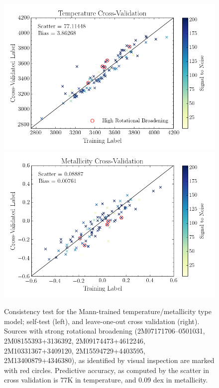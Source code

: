 \documentclass[twocolumn]{aastex62}
\begin{document}
\begin{figure}
	\includegraphics[width=\linewidth]{figures/crv_test_teff.png}
	\includegraphics[width=\linewidth]{figures/crv_test_fe_h.png}
	\caption{Consistency test for the Mann-trained temperature/metallicity type model; self-test (left), and leave-one-out cross validation (right). Sources with strong rotational broadening (2M07171706--0501031, 2M08155393+3136392, 2M09174473+4612246, 2M10331367+3409120, 2M15594729+4403595, 2M13400879+4346380), as identified by visual inspection are marked with red circles. Predictive accuracy, as computed by the scatter in cross validation is 77K in temperature, and 0.09 dex in metallicity.} 
	\label{fig:mann_validation}
\end{figure}
\end{document}
